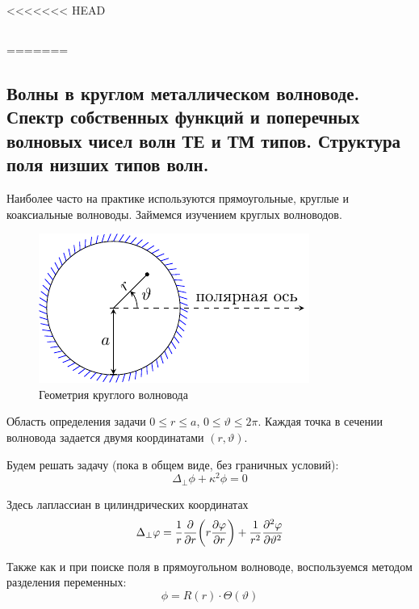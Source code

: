 <<<<<<< HEAD

\subsection{}

=======
\subsection{Волны в круглом металлическом волноводе. Спектр собственных функций и поперечных волновых чисел волн ТЕ и ТМ типов. Структура поля низших типов волн.}


Наиболее часто на практике используются прямоугольные, круглые и коаксиальные волноводы. Займемся изучением круглых волноводов.

\begin{figure}[ht]
	\centering
	\includegraphics[scale=1.65]{img_lect5/cylindric/geometry}
	\caption{Геометрия круглого волновода}
	\label{fig:cylinder:geometry}
\end{figure}

Область определения задачи $0\leq r \leq a$, $0\leq \vartheta \leq 2\pi$. Каждая точка в сечении волновода задается двумя координатами $(r,\vartheta)$.

Будем решать задачу (пока в общем виде, без граничных условий):
\begin{equation}
	\Delta_\perp \phi+\kappa^2\phi=0
\end{equation}

Здесь лаплассиан в цилиндрических координатах
\begin{equation}
	\Delta_\perp\varphi=\frac{1}{r}\pdv{r}\qty(r\pdv{\varphi}{r})+\frac{1}{r^2}\pdv[2]{\varphi}{\vartheta}
\end{equation}

Также как и при поиске поля в прямоугольном волноводе, воспользуемся методом разделения переменных:
\begin{equation}
	\phi=R(r)\cdot\Theta(\vartheta)
\end{equation}

